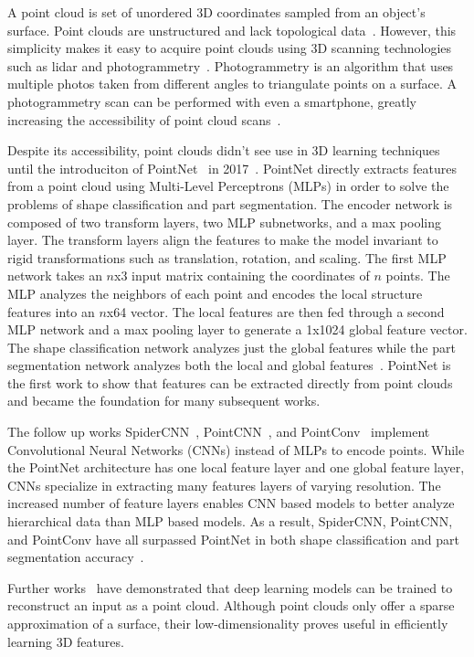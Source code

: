 A point cloud is set of unordered 3D coordinates sampled from an object's surface. Point clouds are unstructured and lack topological data~\cite{Xiao2020}. However, this simplicity makes it easy to acquire point clouds using 3D scanning technologies such as lidar and photogrammetry~\cite{Leberl2010}. Photogrammetry is an algorithm that uses multiple photos taken from different angles to triangulate points on a surface. A photogrammetry scan can be performed with even a smartphone, greatly increasing the accessibility of point cloud scans~\cite{Micheletti2015}.

Despite its accessibility, point clouds didn't see use in 3D learning techniques until the introduciton of PointNet~\cite{Qi2017} in 2017~\cite{Xiao2020}. PointNet directly extracts features from a point cloud using Multi-Level Perceptrons (MLPs) in order to solve the problems of shape classification and part segmentation. The encoder network is composed of two transform layers, two MLP subnetworks, and a max pooling layer. The transform layers align the features to make the model invariant to rigid transformations such as translation, rotation, and scaling. The first MLP network takes an $n$x3 input matrix containing the coordinates of $n$ points. The MLP analyzes the neighbors of each point and encodes the local structure features into an $n$x64 vector. The local features are then fed through a second MLP network and a max pooling layer to generate a 1x1024 global feature vector. The shape classification network analyzes just the global features while the part segmentation network analyzes both the local and global features~\cite{Xiao2020}. PointNet is the first work to show that features can be extracted directly from point clouds and became the foundation for many subsequent works.

The follow up works SpiderCNN~\cite{Xu2018}, PointCNN~\cite{Li2018}, and PointConv~\cite{Wu2019} implement Convolutional Neural Networks (CNNs) instead of MLPs to encode points. While the PointNet architecture has one local feature layer and one global feature layer, CNNs specialize in extracting many features layers of varying resolution. The increased number of feature layers enables CNN based models to better analyze hierarchical data than MLP based models. As a result, SpiderCNN, PointCNN, and PointConv have all surpassed PointNet in both shape classification and part segmentation accuracy~\cite{Wu2019}.

Further works~\cite{Fan2017, Achlioptas2018} have demonstrated that deep learning models can be trained to reconstruct an input as a point cloud. Although point clouds only offer a sparse approximation of a surface, their low-dimensionality proves useful in efficiently learning 3D features.


